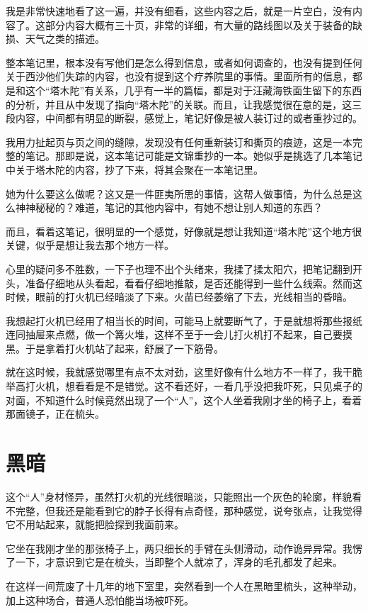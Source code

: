 我是非常快速地看了这一遍，并没有细看，这些内容之后，就是一片空白，没有内容了。这部分内容大概有三十页，非常的详细，有大量的路线图以及关于装备的缺损、天气之类的描述。

整本笔记里，根本没有写他们是怎么得到信息，或者如何调查的，也没有提到任何关于西沙他们失踪的内容，也没有提到这个疗养院里的事情。里面所有的信息，都是和这个“塔木陀”有关系，几乎有一半的篇幅，都是对于汪藏海铁面生留下的东西的分析，并且从中发现了指向“塔木陀”的关联。而且，让我感觉很在意的是，这三段内容，中间都有明显的断裂，感觉上，笔记好像是被人装订过的或者重抄过的。

我用力扯起页与页之间的缝隙，发现没有任何重新装订和撕页的痕迹，这是一本完整的笔记。那即是说，这本笔记可能是文锦重抄的一本。她似乎是挑选了几本笔记中关于塔木陀的内容，抄了下来，将其会聚在一本笔记里。

她为什么要这么做呢？这又是一件匪夷所思的事情，这帮人做事情，为什么总是这么神神秘秘的？难道，笔记的其他内容中，有她不想让别人知道的东西？

而且，看着这笔记，很明显的一个感觉，好像就是想让我知道“塔木陀”这个地方很关键，似乎是想让我去那个地方一样。

心里的疑问多不胜数，一下子也理不出个头绪来，我揉了揉太阳穴，把笔记翻到开头，准备仔细地从头看起，看看仔细地推敲，是否还能得到一些什么线索。然而这时候，眼前的打火机已经暗淡了下来。火苗已经萎缩了下去，光线相当的昏暗。

我想起打火机已经用了相当长的时间，可能马上就要断气了，于是就想将那些报纸连同抽屉来点燃，做一个篝火堆，这样不至于一会儿打火机打不起来，自己要摸黑。于是拿着打火机站了起来，舒展了一下筋骨。

就在这时候，我就感觉哪里有点不太对劲，这里好像有什么地方不一样了，我干脆举高打火机，想看看是不是错觉。这不看还好，一看几乎没把我吓死，只见桌子的对面，不知道什么时候竟然出现了一个“人”，这个人坐着我刚才坐的椅子上，看着那面镜子，正在梳头。

\chapter{黑暗}

这个“人”身材怪异，虽然打火机的光线很暗淡，只能照出一个灰色的轮廓，样貌看不完整，但我还是能看到它的脖子长得有点奇怪，那种感觉，说夸张点，让我觉得它不用站起来，就能把脸探到我面前来。

它坐在我刚才坐的那张椅子上，两只细长的手臂在头侧滑动，动作诡异异常。我愣了一下，才意识到它是在梳头，当即整个人就凉了，浑身的毛孔都发了起来。

在这样一间荒废了十几年的地下室里，突然看到一个人在黑暗里梳头，这种举动，加上这种场合，普通人恐怕能当场被吓死。

